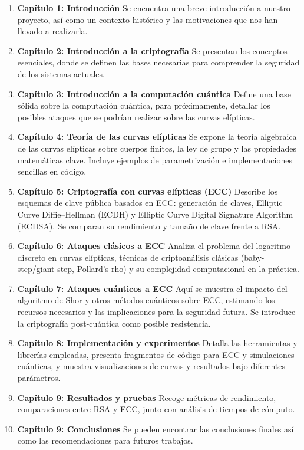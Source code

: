 \begin{enumerate}
  \item \textbf{Capítulo 1: Introducción}  
    Se encuentra una breve introducción a nuestro proyecto, así como un contexto histórico y las motivaciones que nos han llevado a realizarla.
  \item \textbf{Capítulo 2: Introducción a la criptografía}  
    Se presentan los conceptos esenciales, donde se definen las bases necesarias para comprender la seguridad de los sistemas actuales.
  \item \textbf{Capítulo 3: Introducción a la computación cuántica}  
    Define una base sólida sobre la computación cuántica, para próximamente, detallar los posibles ataques que se podrían realizar sobre las curvas elípticas.
  \item \textbf{Capítulo 4: Teoría de las curvas elípticas}  
    Se expone la teoría algebraica de las curvas elípticas sobre cuerpos finitos, la ley de grupo y las propiedades matemáticas clave. Incluye ejemplos de parametrización e implementaciones sencillas en código.
  \item \textbf{Capítulo 5: Criptografía con curvas elípticas (ECC)}  
    Describe los esquemas de clave pública basados en ECC: generación de claves, Elliptic Curve Diffie–Hellman (ECDH) y Elliptic Curve Digital Signature Algorithm (ECDSA). Se comparan su rendimiento y tamaño de clave frente a RSA.
  \item \textbf{Capítulo 6: Ataques clásicos a ECC}  
    Analiza el problema del logaritmo discreto en curvas elípticas, técnicas de criptoanálisis clásicas (baby-step/giant-step, Pollard’s rho) y su complejidad computacional en la práctica.
  \item \textbf{Capítulo 7: Ataques cuánticos a ECC}  
    Aquí se muestra el impacto del algoritmo de Shor y otros métodos cuánticos sobre ECC, estimando los recursos necesarios y las implicaciones para la seguridad futura. Se introduce la criptografía post-cuántica como posible resistencia.
  \item \textbf{Capítulo 8: Implementación y experimentos}  
    Detalla las herramientas y librerías empleadas, presenta fragmentos de código para ECC y simulaciones cuánticas, y muestra visualizaciones de curvas y resultados bajo diferentes parámetros.
  \item \textbf{Capítulo 9: Resultados y pruebas}  
     Recoge métricas de rendimiento, comparaciones entre RSA y ECC, junto con análisis de tiempos de cómputo.
  \item \textbf{Capítulo 9: Conclusiones}  
     Se pueden encontrar las conclusiones finales así como las recomendaciones para futuros trabajos.
\end{enumerate}

